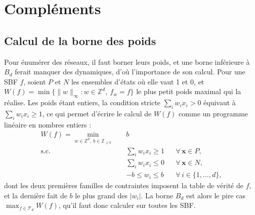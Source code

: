 \documentclass[12pt, a4paper]{article}
\begin{document}
\newpage
\printbibliography[title={Références}]

\newpage
\appendix
\section{Compléments}
\label{ann:complements}

\subsection{Calcul de la borne des poids}
\label{sec:calcul-borne}

Pour énumérer des réseaux, il faut borner leurs poids, et une borne inférieure à $B_d$ ferait manquer des dynamiques, d'où l'importance de son calcul.
Pour une SBF $f$, soient $P$ et $N$ les ensembles d'états où elle vaut 1 et 0, et $W(f) = \min\{ \|w\|_\infty : w \in \mathbb{Z}^d,\ f_w = f \}$ le plus petit poids maximal qui la réalise.
Les poids étant entiers, la condition stricte $\sum_i w_i x_i > 0$ équivaut à $\sum_i w_i x_i \ge 1$, ce qui permet d'écrire le calcul de $W(f)$ comme un programme linéaire en nombres entiers :
\begin{equation}
\begin{aligned}
W(f) = \min_{w \in \mathbb{Z}^d,\ b \in \mathbb{Z}_{\ge 0}}\quad & b\\
\text{s.c.}\quad
& \textstyle\sum_i w_i x_i \ge 1 && \forall\, \mathbf{x} \in P,\\
& \textstyle\sum_i w_i x_i \le 0 && \forall\, \mathbf{x} \in N,\\
& -b \le w_i \le b && \forall\, i \in \{1,\dots,d\},
\end{aligned}
\end{equation}
dont les deux premières familles de contraintes imposent la table de vérité de $f$, et la dernière fait de $b$ le plus grand des $|w_i|$.
La borne $B_d$ est alors le pire cas $\max_{f \in \mathcal{T}_d} W(f)$, qu'il faut donc calculer sur toutes les SBF.
\end{document}
